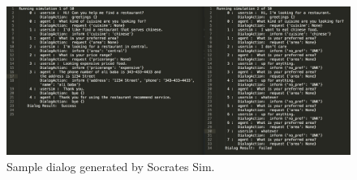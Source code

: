 \begin{figure}[h!]
	\centering
	\includegraphics[scale=.16]{diagrams/sample_res_output.jpeg}
	\caption{ Sample dialog generated by Socrates Sim.}
	\label{fig:ex_output}
\end{figure}



